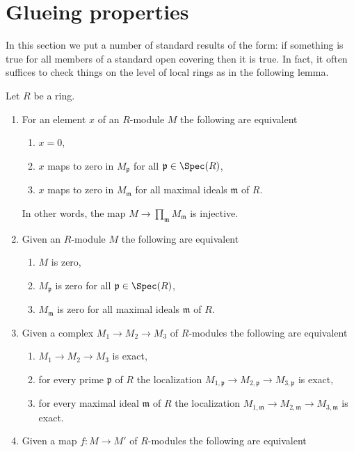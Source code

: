 \section{Glueing properties}
\label{section-more-glueing}

\noindent
In this section we put a number of standard results of the
form: if something is true for all members of a standard open
covering then it is true. In fact, it often suffices to check
things on the level of local rings as in the following lemma.

\begin{lemma}
\label{lemma-characterize-zero-local}
Let $R$ be a ring.
\begin{enumerate}
\item For an element $x$ of an $R$-module $M$ the following are equivalent
\begin{enumerate}
\item $x = 0$,
\item $x$ maps to zero in $M_\mathfrak p$ for all $\mathfrak p \in \Spec(R)$,
\item $x$ maps to zero in $M_{\mathfrak m}$ for all maximal ideals
$\mathfrak m$ of $R$.
\end{enumerate}
In other words, the map $M \to \prod_{\mathfrak m} M_{\mathfrak m}$
is injective.
\item Given an $R$-module $M$ the following are equivalent
\begin{enumerate}
\item $M$ is zero,
\item $M_{\mathfrak p}$ is zero for all $\mathfrak p \in \Spec(R)$,
\item $M_{\mathfrak m}$ is zero for all maximal ideals $\mathfrak m$ of $R$.
\end{enumerate}
\item Given a complex $M_1 \to M_2 \to M_3$
of $R$-modules the following are equivalent
\begin{enumerate}
\item $M_1 \to M_2 \to M_3$ is exact,
\item for every prime $\mathfrak p$ of $R$ the localization
$M_{1, \mathfrak p} \to M_{2, \mathfrak p} \to M_{3, \mathfrak p}$
is exact,
\item for every maximal ideal $\mathfrak m$ of $R$ the localization
$M_{1, \mathfrak m} \to M_{2, \mathfrak m} \to M_{3, \mathfrak m}$
is exact.
\end{enumerate}
\item Given a map $f : M \to M'$ of $R$-modules the following are equivalent

\end{enumerate}
\end{lemma}
